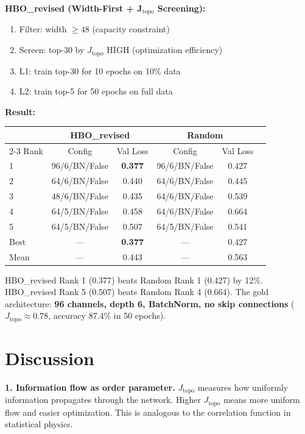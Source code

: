 \documentclass[11pt, a4paper]{article}
\theoremstyle{plain}
\begin{document}
\textbf{HBO\_revised (Width-First + J$_{\mathrm{topo}}$ Screening):}
\begin{enumerate}
\item Filter: width $\geq 48$ (capacity constraint)
\item Screen: top-30 by $J_{\mathrm{topo}}$ HIGH (optimization efficiency)
\item L1: train top-30 for 10 epochs on 10\% data
\item L2: train top-5 for 50 epochs on full data
\end{enumerate}

\textbf{Result:}

\begin{center}
\begin{tabular}{lccccc}
\toprule
 & \multicolumn{2}{c}{HBO\_revised} & \multicolumn{2}{c}{Random} \\
\cmidrule{2-3} \cmidrule{4-5}
Rank & Config & Val Loss & Config & Val Loss \\
\midrule
1 & 96/6/BN/False & \textbf{0.377} & 96/6/BN/False & 0.427 \\
2 & 64/6/BN/False & 0.440 & 64/6/BN/False & 0.445 \\
3 & 48/6/BN/False & 0.435 & 64/6/BN/False & 0.539 \\
4 & 64/5/BN/False & 0.458 & 64/6/BN/False & 0.664 \\
5 & 64/5/BN/False & 0.507 & 64/5/BN/False & 0.541 \\
\midrule
Best & — & \textbf{0.377} & — & 0.427 \\
Mean & — & 0.443 & — & 0.563 \\
\bottomrule
\end{tabular}
\end{center}

HBO\_revised Rank 1 (0.377) beats Random Rank 1 (0.427) by 12\%. HBO\_revised Rank 5 (0.507) beats Random Rank 4 (0.664). The gold architecture: \textbf{96 channels, depth 6, BatchNorm, no skip connections} ($J_{\mathrm{topo}} \approx 0.78$, accuracy 87.4\% in 50 epochs).

\section{Discussion}

\textbf{1. Information flow as order parameter.} $J_{\mathrm{topo}}$ measures how uniformly information propagates through the network. Higher $J_{\mathrm{topo}}$ means more uniform flow and easier optimization. This is analogous to the correlation function in statistical physics.
\end{document}
